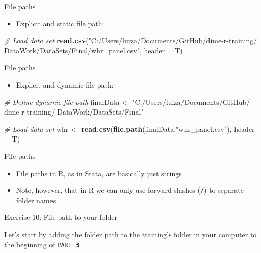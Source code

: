 \documentclass[ignorenonframetext,]{beamer}
\newenvironment{Shaded}{\begin{snugshade}}{\end{snugshade}}
\newcommand{\KeywordTok}[1]{\textcolor[rgb]{0.13,0.29,0.53}{\textbf{#1}}}
\newcommand{\DataTypeTok}[1]{\textcolor[rgb]{0.13,0.29,0.53}{#1}}
\newcommand{\StringTok}[1]{\textcolor[rgb]{0.31,0.60,0.02}{#1}}
\newcommand{\CommentTok}[1]{\textcolor[rgb]{0.56,0.35,0.01}{\textit{#1}}}
\newcommand{\NormalTok}[1]{#1}
\providecommand{\tightlist}{%
  \setlength{\itemsep}{0pt}\setlength{\parskip}{0pt}}
\begin{document}
\begin{frame}[fragile]{File paths}

\begin{itemize}
\tightlist
\item
  Explicit and static file path:
\end{itemize}

\begin{Shaded}
\begin{Highlighting}[]
  \CommentTok{# Load data set}
  \KeywordTok{read.csv}\NormalTok{(}\StringTok{"C:/Users/luiza/Documents/GitHub/dime-r-training/}
\StringTok{           DataWork/DataSets/Final/whr_panel.csv"}\NormalTok{,}
            \DataTypeTok{header =}\NormalTok{ T)}
\end{Highlighting}
\end{Shaded}

\end{frame}

\begin{frame}[fragile]{File paths}

\begin{itemize}
\tightlist
\item
  Explicit and dynamic file path:
\end{itemize}

\begin{Shaded}
\begin{Highlighting}[]
  \CommentTok{# Define dynamic file path}
\NormalTok{  finalData <-}\StringTok{ "C:/Users/luiza/Documents/GitHub/}
\StringTok{                dime-r-training/}
\StringTok{                DataWork/DataSets/Final"}
  
  \CommentTok{# Load data set}
\NormalTok{  whr <-}\StringTok{ }\KeywordTok{read.csv}\NormalTok{(}\KeywordTok{file.path}\NormalTok{(finalData,}\StringTok{"whr_panel.csv"}\NormalTok{),}
                  \DataTypeTok{header =}\NormalTok{ T)}
\end{Highlighting}
\end{Shaded}

\end{frame}

\begin{frame}[fragile]{File paths}

\begin{itemize}
\tightlist
\item
  File paths in R, as in Stata, are basically just strings
\item
  Note, however, that in R we can only use forward slashes (\texttt{/})
  to separate folder names
\end{itemize}

\begin{block}{Exercise 10: File path to your folder}

Let's start by adding the folder path to the training's folder in your
computer to the beginning of \texttt{PART\ 3}

\end{block}

\end{frame}
\end{document}
